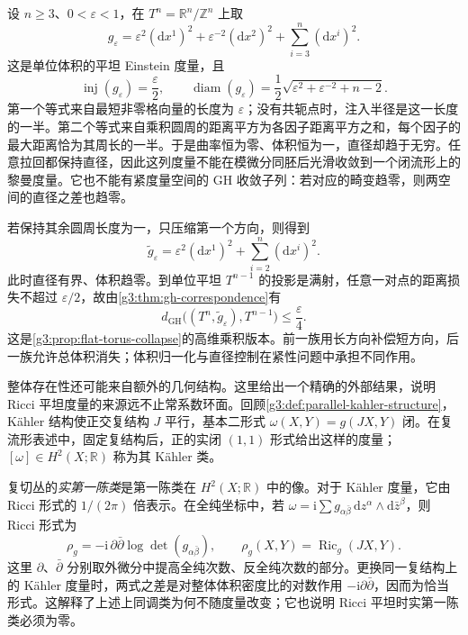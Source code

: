\begin{example}\label{g3:exm:unit-volume-flat-torus-degeneration}
	设 \(n\ge3\)、\(0<\varepsilon<1\)，在 \(T^n=\mathbb R^n/\mathbb Z^n\) 上取
	\[
		g_\varepsilon=\varepsilon^2(\mathrm dx^1)^2
		+\varepsilon^{-2}(\mathrm dx^2)^2
		+\sum_{i=3}^n(\mathrm dx^i)^2.
	\]
	这是单位体积的平坦 Einstein 度量，且
	\[
		\operatorname{inj}(g_\varepsilon)=\frac\varepsilon2,
		\qquad
		\operatorname{diam}(g_\varepsilon)
		=\frac12\sqrt{\varepsilon^2+\varepsilon^{-2}+n-2}.
	\]
	第一个等式来自最短非零格向量的长度为 \(\varepsilon\)；没有共轭点时，注入半径是这一长度的一半。第二个等式来自乘积圆周的距离平方为各因子距离平方之和，每个因子的最大距离恰为其周长的一半。于是曲率恒为零、体积恒为一，直径却趋于无穷。任意拉回都保持直径，因此这列度量不能在模微分同胚后光滑收敛到一个闭流形上的黎曼度量。它也不能有紧度量空间的 GH 收敛子列：若对应的畸变趋零，则两空间的直径之差也趋零。
\end{example}

若保持其余圆周长度为一，只压缩第一个方向，则得到
\[
	\widetilde g_\varepsilon
	=\varepsilon^2(\mathrm dx^1)^2+\sum_{i=2}^n(\mathrm dx^i)^2.
\]
此时直径有界、体积趋零。到单位平坦 \(T^{n-1}\) 的投影是满射，任意一对点的距离损失不超过 \(\varepsilon/2\)，故由\cref{g3:thm:gh-correspondence}有
\[
	d_{\mathrm{GH}}\bigl((T^n,\widetilde g_\varepsilon),T^{n-1}\bigr)
	\le\frac\varepsilon4.
\]
这是\cref{g3:prop:flat-torus-collapse}的高维乘积版本。前一族用长方向补偿短方向，后一族允许总体积消失；体积归一化与直径控制在紧性问题中承担不同作用。

\ProseParagraphBreak

整体存在性还可能来自额外的几何结构。这里给出一个精确的外部结果，说明 Ricci 平坦度量的来源远不止常系数环面。回顾\cref{g3:def:parallel-kahler-structure}，Kähler 结构使正交复结构 \(J\) 平行，基本二形式 \(\omega(X,Y)=g(JX,Y)\) 闭。在复流形表述中，固定复结构后，正的实闭 \((1,1)\) 形式给出这样的度量；\([\omega]\in H^2(X;\mathbb R)\) 称为其 Kähler 类。

复切丛的\emph{实第一陈类}是第一陈类在 \(H^2(X;\mathbb R)\) 中的像。对于 Kähler 度量，它由 Ricci 形式的 \(1/(2\pi)\) 倍表示。在全纯坐标中，若 \(\omega=\mathrm i\sum g_{\alpha\bar\beta}\,\mathrm dz^\alpha\wedge\mathrm d\bar z^\beta\)，则 Ricci 形式为
\[
	\rho_g=-\mathrm i\,\partial\bar\partial\log\det(g_{\alpha\bar\beta}),
	\qquad \rho_g(X,Y)=\operatorname{Ric}_g(JX,Y).
\]
这里 \(\partial\)、\(\bar\partial\) 分别取外微分中提高全纯次数、反全纯次数的部分。更换同一复结构上的 Kähler 度量时，两式之差是对整体体积密度比的对数作用 \(-\mathrm i\partial\bar\partial\)，因而为恰当形式。这解释了上述上同调类为何不随度量改变；它也说明 Ricci 平坦时实第一陈类必须为零。

